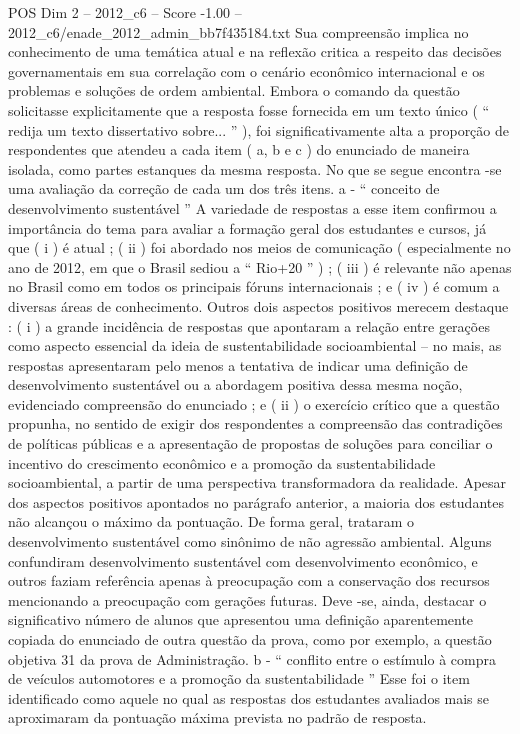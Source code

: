 \begin{textsample}{POS Dim 2 – 2012\_c6 – Score -1.00 – 2012\_c6/enade\_2012\_admin\_bb7f435184.txt}
Sua compreensão implica no conhecimento de uma temática atual e na reflexão critica a respeito das decisões governamentais em sua correlação com o cenário econômico internacional e os problemas e soluções de ordem ambiental.
Embora o comando da questão solicitasse explicitamente que a resposta fosse fornecida em um texto único ( “ redija um texto dissertativo sobre... ” ), foi significativamente alta a proporção de respondentes que atendeu a cada item ( a, b e c ) do enunciado de maneira isolada, como partes estanques da mesma resposta.
No que se segue encontra -se uma avaliação da correção de cada um dos três itens. a - “ conceito de desenvolvimento sustentável ” A variedade de respostas a esse item confirmou a importância do tema para avaliar a formação geral dos estudantes e cursos, já que ( i ) é atual ; ( ii ) foi abordado nos meios de comunicação ( especialmente no ano de 2012, em que o Brasil sediou a “ Rio+20 ” ) ; ( iii ) é relevante não apenas no Brasil como em todos os principais fóruns internacionais ; e ( iv ) é comum a diversas áreas de conhecimento.
Outros dois aspectos positivos merecem destaque : ( i ) a grande incidência de respostas que apontaram a relação entre gerações como aspecto essencial da ideia de sustentabilidade socioambiental – no mais, as respostas apresentaram pelo menos a tentativa de indicar uma definição de desenvolvimento sustentável ou a abordagem positiva dessa mesma noção, evidenciado compreensão do enunciado ; e ( ii ) o exercício crítico que a questão propunha, no sentido de exigir dos respondentes a compreensão das contradições de políticas públicas e a apresentação de propostas de soluções para conciliar o incentivo do crescimento econômico e a promoção da sustentabilidade socioambiental, a partir de uma perspectiva transformadora da realidade.
Apesar dos aspectos positivos apontados no parágrafo anterior, a maioria dos estudantes não alcançou o máximo da pontuação.
De forma geral, trataram o desenvolvimento sustentável como sinônimo de não agressão ambiental.
Alguns confundiram desenvolvimento sustentável com desenvolvimento econômico, e outros faziam referência apenas à preocupação com a conservação dos recursos mencionando a preocupação com gerações futuras.
Deve -se, ainda, destacar o significativo número de alunos que apresentou uma definição aparentemente copiada do enunciado de outra questão da prova, como por exemplo, a questão objetiva 31 da prova de Administração. b - “ conflito entre o estímulo à compra de veículos automotores e a promoção da sustentabilidade ” Esse foi o item identificado como aquele no qual as respostas dos estudantes avaliados mais se aproximaram da pontuação máxima prevista no padrão de resposta.

\end{textsample}
